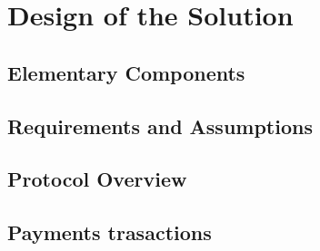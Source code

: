 \section{Design of the Solution}



\subsection{Elementary Components}



\subsection{Requirements and Assumptions }



\subsection{Protocol Overview}



\subsection{Payments trasactions}


